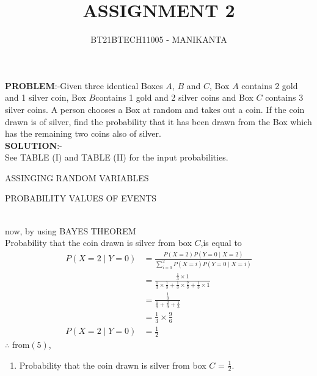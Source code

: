 \documentclass[journal,12pt,twocolumn]{IEEEtran}
\begin{document}
\vspace{3cm}
\title{ASSIGNMENT 2}
\author{BT21BTECH11005 - MANIKANTA}

\maketitle
\textbf{PROBLEM}:-Given three identical Boxes $A$, $B$ and $C$, Box $A$ contains 2 gold and 1 silver coin, Box $B $contains 1 gold and 2 silver coins and Box $C$ contains 3 silver coins. A person chooses a Box at random and takes out a coin. If the coin drawn is of silver, find the probability that it has been drawn from the Box which has the remaining two coins also of silver.\\

\textbf{SOLUTION}:-\\
See TABLE (I) and TABLE (II) for the input probabilities.
\begin{table}[ht!]
\centering
 
\caption{ASSINGING RANDOM VARIABLES}
\label{Tables : TABLE}
\end{table}

 \begin{table}[ht!]
 
\caption{PROBABILITY VALUES OF EVENTS}
\label{Tables : TABLE}
\end{table}\\

now,
by using BAYES THEOREM\\
Probability that the coin drawn is silver from box $C$,is equal to
\begin{align}
P(X = 2 \mid Y = 0) &= \frac{P(X = 2)P(Y = 0 \mid X = 2)}{\sum_{i=0}^{2} P(X = i)P(Y=0 \mid X = i)}\\
 &= \frac{\frac{1}{3} \times 1}{\frac{1}{3} \times \frac{1}{3}+\frac{1}{3} \times \frac{2}{3}+\frac{1}{3} \times 1
 }\\
 &= \frac{\frac{1}{3}}{\frac{1}{9}+\frac{2}{9}+\frac{1}{3}}\\
 &= \frac{1}{3} \times \frac{9}{6}\\
 P(X = 2 \mid Y = 0) &= \frac{1}{2}
\end{align}
$\therefore$ from$(5)$,\\
\begin{enumerate}[label=]
\item Probability that the coin drawn is silver from box $C$ = $\frac{1}{2}$.
\end{enumerate}
\end{document}
